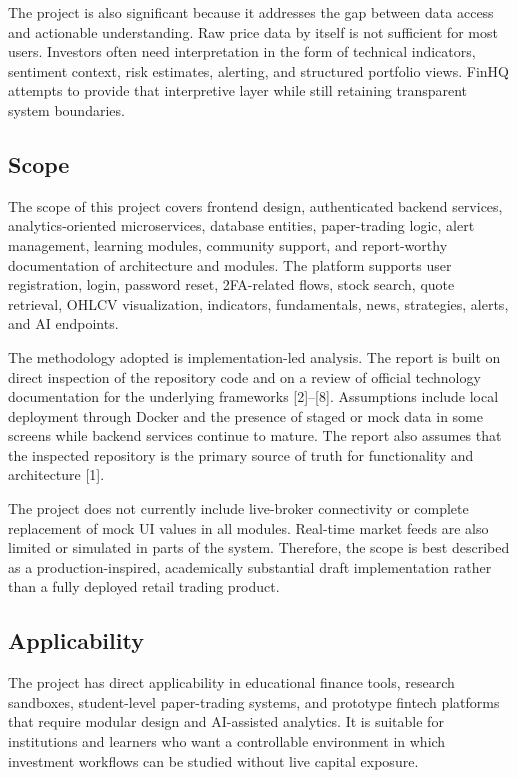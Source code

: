\documentclass[12pt,a4paper]{report}
\newcommand{\projectshort}{FinHQ}
\begin{document}
The project is also significant because it addresses the gap between data access and actionable understanding. Raw price data by itself is not sufficient for most users. Investors often need interpretation in the form of technical indicators, sentiment context, risk estimates, alerting, and structured portfolio views. \projectshort{} attempts to provide that interpretive layer while still retaining transparent system boundaries.

\subsection{Scope}
The scope of this project covers frontend design, authenticated backend services, analytics-oriented microservices, database entities, paper-trading logic, alert management, learning modules, community support, and report-worthy documentation of architecture and modules. The platform supports user registration, login, password reset, 2FA-related flows, stock search, quote retrieval, OHLCV visualization, indicators, fundamentals, news, strategies, alerts, and AI endpoints.

The methodology adopted is implementation-led analysis. The report is built on direct inspection of the repository code and on a review of official technology documentation for the underlying frameworks [2]--[8]. Assumptions include local deployment through Docker and the presence of staged or mock data in some screens while backend services continue to mature. The report also assumes that the inspected repository is the primary source of truth for functionality and architecture [1].

The project does not currently include live-broker connectivity or complete replacement of mock UI values in all modules. Real-time market feeds are also limited or simulated in parts of the system. Therefore, the scope is best described as a production-inspired, academically substantial draft implementation rather than a fully deployed retail trading product.

\subsection{Applicability}
The project has direct applicability in educational finance tools, research sandboxes, student-level paper-trading systems, and prototype fintech platforms that require modular design and AI-assisted analytics. It is suitable for institutions and learners who want a controllable environment in which investment workflows can be studied without live capital exposure.
\end{document}
